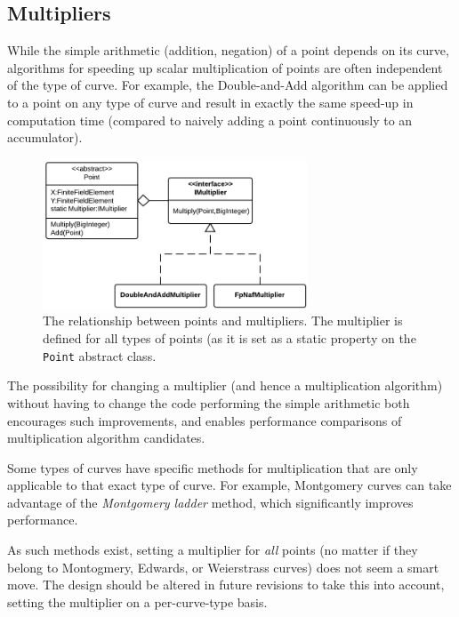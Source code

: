 \subsection{Multipliers}
\label{sec:implementation_multipliers}
\label{sec:implementation_multiplication}

While the simple arithmetic (addition, negation) of a point depends on its curve, algorithms for speeding up scalar
multiplication of points are often independent of the type of curve. For example, the Double-and-Add algorithm can
be applied to a point on any type of curve and result in exactly the same speed-up in computation time (compared to
naively adding a point continuously to an accumulator).

\begin{figure}[htb]
	\centering
	\includegraphics[width=0.7\textwidth]{implementation/multipliers}
	\caption{The relationship between points and multipliers. The multiplier is defined for all types of points (as it
		is set as a static property on the \texttt{Point} abstract class.}
\end{figure}

The possibility for changing a multiplier (and hence a multiplication algorithm) without having to change the code
performing the simple arithmetic both encourages such improvements, and enables performance comparisons of multiplication
algorithm candidates.

Some types of curves have specific methods for multiplication that are only applicable to that exact type of curve. For
example, Montgomery curves can take advantage of the \emph{Montgomery ladder} method, which significantly improves
performance.\cite{safecurves}

As such methods exist, setting a multiplier for \emph{all} points (no matter if they belong to Montogmery, Edwards, or
Weierstrass curves) does not seem a smart move. The design should be altered in future revisions to take this into account,
setting the multiplier on a per-curve-type basis.
